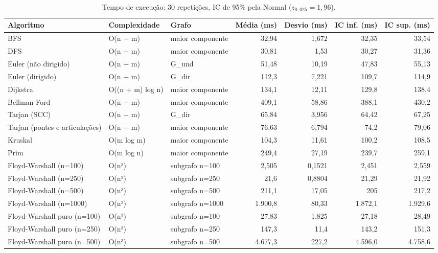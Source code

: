 \begin{table}[t]
\centering
\small
\caption{Tempo de execução: 30 repetições, IC de 95\% pela Normal ($z_{0{,}025}=1{,}96$).}
\label{tab:tempos}
\begin{adjustbox}{max width=\linewidth}
\begin{tabular}{lllrrrr}
\toprule
Algoritmo & Complexidade & Grafo & Média (ms) & Desvio (ms) & IC inf. (ms) & IC sup. (ms) \\
\midrule
BFS & O(n + m) & maior componente & 32,94 & 1,672 & 32,35 & 33,54 \\
DFS & O(n + m) & maior componente & 30,81 & 1,53 & 30,27 & 31,36 \\
Euler (não dirigido) & O(n + m) & G\_und & 51,48 & 10,19 & 47,83 & 55,13 \\
Euler (dirigido) & O(n + m) & G\_dir & 112,3 & 7,221 & 109,7 & 114,9 \\
Dijkstra & O((n + m) log n) & maior componente & 134,1 & 12,11 & 129,8 & 138,4 \\
Bellman-Ford & O(n · m) & maior componente & 409,1 & 58,86 & 388,1 & 430,2 \\
Tarjan (SCC) & O(n + m) & G\_dir & 65,84 & 3,956 & 64,42 & 67,25 \\
Tarjan (pontes e articulações) & O(n + m) & maior componente & 76,63 & 6,794 & 74,2 & 79,06 \\
Kruskal & O(m log m) & maior componente & 104,3 & 11,61 & 100,2 & 108,5 \\
Prim & O(m log n) & maior componente & 249,4 & 27,19 & 239,7 & 259,1 \\
Floyd-Warshall (n=100) & O(n³) & subgrafo n=100 & 2,505 & 0,1521 & 2,451 & 2,559 \\
Floyd-Warshall (n=250) & O(n³) & subgrafo n=250 & 21,6 & 0,8804 & 21,29 & 21,92 \\
Floyd-Warshall (n=500) & O(n³) & subgrafo n=500 & 211,1 & 17,05 & 205 & 217,2 \\
Floyd-Warshall (n=1000) & O(n³) & subgrafo n=1000 & 1.900,8 & 80,33 & 1.872,1 & 1.929,6 \\
Floyd-Warshall puro (n=100) & O(n³) & subgrafo n=100 & 27,83 & 1,825 & 27,18 & 28,49 \\
Floyd-Warshall puro (n=250) & O(n³) & subgrafo n=250 & 147,3 & 11,4 & 143,2 & 151,3 \\
Floyd-Warshall puro (n=500) & O(n³) & subgrafo n=500 & 4.677,3 & 227,2 & 4.596,0 & 4.758,6 \\
\bottomrule
\end{tabular}
\end{adjustbox}
\end{table}
